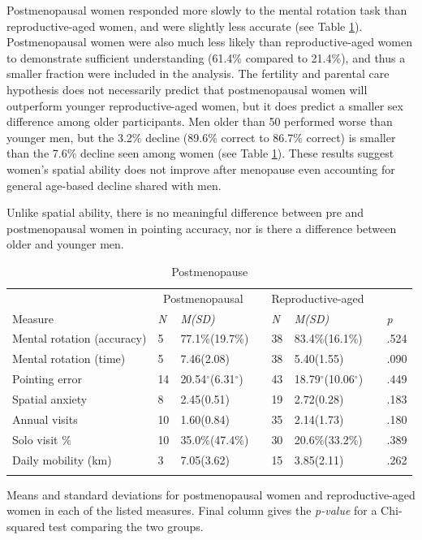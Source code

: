Postmenopausal women responded more slowly to the mental rotation task than reproductive-aged women, and were slightly less accurate (see Table \ref{tab:meno}).  Postmenopausal women were also much less likely than reproductive-aged women to demonstrate sufficient understanding (61.4\% compared to 21.4\%), and thus a smaller fraction were included in the analysis.  The fertility and parental care hypothesis does not necessarily predict that postmenopausal women will outperform younger reproductive-aged women, but it does predict a smaller sex difference among older participants.  Men older than 50 performed worse than younger men, but the 3.2\% decline (89.6\% correct to 86.7\% correct) is smaller than the 7.6\% decline seen among women (see Table \ref{tab:meno}).  These results suggest women's spatial ability does not improve after menopause even accounting for general age-based decline shared with men.  

Unlike spatial ability, there is no meaningful difference between pre and postmenopausal women in pointing accuracy, nor is there a difference between older and younger men.

\begin{table}[h!]
\caption{Postmenopause}
\label{tab:meno}  
\begin{tabular}{llllllll}
\hline\noalign{\smallskip}
& \multicolumn{2}{c}{Postmenopausal} && \multicolumn{2}{c}{Reproductive-aged} && \\
Measure & \emph{N} & \emph{M(SD)} && \emph{N} & \emph{M(SD)} && \emph{p} \\
\noalign{\smallskip}\hline\noalign{\smallskip}
Mental rotation (accuracy) & 5 & 77.1\%(19.7\%) && 38 & 83.4\%(16.1\%) && .524 \\
Mental rotation (time) & 5 & 7.46(2.08) && 38 & 5.40(1.55) && .090 \\
Pointing error & 14 & 20.54$^{\circ}$(6.31$^{\circ}$) && 43 & 18.79$^{\circ}$(10.06$^{\circ}$) && .449 \\
Spatial anxiety & 8 & 2.45(0.51) && 19 & 2.72(0.28) && .183 \\
Annual visits & 10 & 1.60(0.84) && 35 & 2.14(1.73) && .180 \\
Solo visit \% & 10 & 35.0\%(47.4\%) && 30 & 20.6\%(33.2\%) && .389 \\
Daily mobility (km) & 3 & 7.05(3.62) && 15 & 3.85(2.11) && .262 \\
\noalign{\smallskip}\hline
\end{tabular}\par
\bigskip
Means and standard deviations for postmenopausal women and reproductive-aged women in each of the listed measures. Final column gives the \emph{p-value} for a Chi-squared test comparing the two groups. \end{table}	

